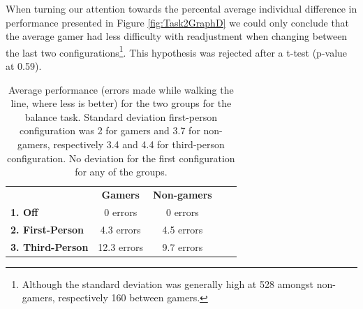 \documentclass[runningheads,a4paper,oribibl]{llncs}
\begin{document}
When turning our attention towards the percental average individual difference in performance presented in Figure \ref{fig:Task2GraphD} we could only conclude that the average gamer had less difficulty with readjustment when changing between the last two configurations\footnote{Although the standard deviation was generally high at 528 amongst non-gamers, respectively 160 between gamers.}. This hypothesis was rejected after a t-test (p-value at 0.59).


\begin{table}[]
\centering
\setlength{\tabcolsep}{1em}
\def\arraystretch{1.8}
\begin{tabular}{l|c|cll}
                      & {\textbf{Gamers}} & {\textbf{Non-gamers}} &  &  \\ \cline{1-3}
\textbf{1. Off}          & 0 errors                                    & 0 errors                                          &  &  \\ \cline{1-3}
\textbf{2. First-Person} & 4.3 errors                                   & 4.5 errors                                        &  &  \\ \cline{1-3}
\textbf{3. Third-Person} & 12.3 errors                                    & 9.7 errors                                        &  & 
\end{tabular}
\caption{Average performance (errors made while walking the line, where less is better) for the two groups for the balance task. Standard deviation first-person configuration was 2 for gamers and 3.7 for non-gamers, respectively 3.4 and 4.4 for third-person configuration. No deviation for the first configuration for any of the groups.}
\label{tab:Task2GraphP}
\end{table}




\end{document}
